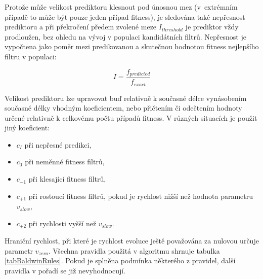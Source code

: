 Protože může velikost prediktoru klesnout pod únosnou mez (v~extrémním případě to může být pouze jeden případ fitness), je sledována také nepřesnost prediktoru a při překročení předem zvolené meze $I_\mathit{threshold}$ je prediktor vždy prodloužen, bez ohledu na vývoj v populaci kandidátních filtrů. Nepřesnost je vypočtena jako poměr mezi predikovanou a skutečnou hodnotou fitness nejlepšího filtru v populaci:

\begin{equation}
    \mathit{I} = \frac{f_{\mathit{predicted}}}{f_{\mathit{exact}}}
\end{equation}

Velikost prediktoru lze upravovat buď relativně k současné délce vynásobením současné délky vhodným koeficientem, nebo přičtením či odečtením hodnoty určené relativně k celkovému počtu případů fitness. V různých situacích je použit jiný koeficient: %

\begin{itemize}
    \item $c_I$ při nepřesné predikci,
    \item $c_0$ při neměnné fitness filtrů,
    \item $c_{-1}$ při klesající fitness filtrů,
    \item $c_{+1}$ při rostoucí fitness filtrů, pokud je rychlost nižší než hodnota parametru $v_\mathit{slow}$,
    \item $c_{+2}$ při rychlosti vyšší než $v_\mathit{slow}$.
\end{itemize}

Hraniční rychlost, při které je rychlost evoluce ještě považována za nulovou určuje parametr $v_\mathit{zero}$. Všechna pravidla použitá v algoritmu shrnuje tabulka \ref{tabBaldwinRules}. Pokud je splněna podmínka některého z pravidel, další pravidla v pořadí se již nevyhodnocují.


